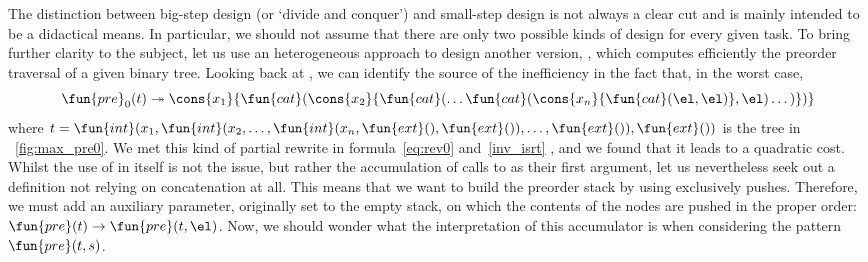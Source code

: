 The distinction between big\hyp{}step design (or `divide and conquer') and
small\hyp{}step design is not always a
clear cut and is mainly intended to be a didactical means. In
particular, we should not assume that there are only two possible
kinds of design for every given task. To bring further clarity to the
subject, let us use an heterogeneous approach to design another
version, , which computes
efficiently the preorder traversal of a given binary tree. Looking
back at , we can
identify the source of the inefficiency in the fact that, in the worst
case,
\begin{equation*}
\fun{pre}_0(t) \twoheadrightarrow
\cons{x_1}{\fun{cat}(\cons{x_2}{\fun{cat}(\dots
    \fun{cat}(\cons{x_n}{\fun{cat}(\el, \el)},\el) \dots)})}
\index{cat@\fun{cat/2}}
\end{equation*}
where \(t = \fun{int}(x_1,\fun{int}(x_2,\dots, \fun{int}(x_n,
\fun{ext}(), \fun{ext}()), \dots, \fun{ext}()),\fun{ext}())\) is the
tree in \fig~\vref{fig:max_pre0}. We met this kind of partial rewrite
in formula~\eqref{eq:rev0}
 and~\eqref{inv_isrt}
,
and we found that it leads to a quadratic cost.  Whilst the use of
 in itself is not the issue, but
rather the accumulation of calls to 
as their first argument, let us nevertheless seek out a definition not
relying on concatenation at all. This means that we want to build the
preorder stack by using exclusively pushes. Therefore, we must add an
auxiliary parameter, originally set to the empty stack, on which the
contents of the nodes are pushed in the proper order: \(\fun{pre}(t)
\rightarrow \fun{pre}(t,\el)\). Now, we should
wonder what the interpretation of this accumulator is when considering the pattern
\(\fun{pre}(t,s)\).

